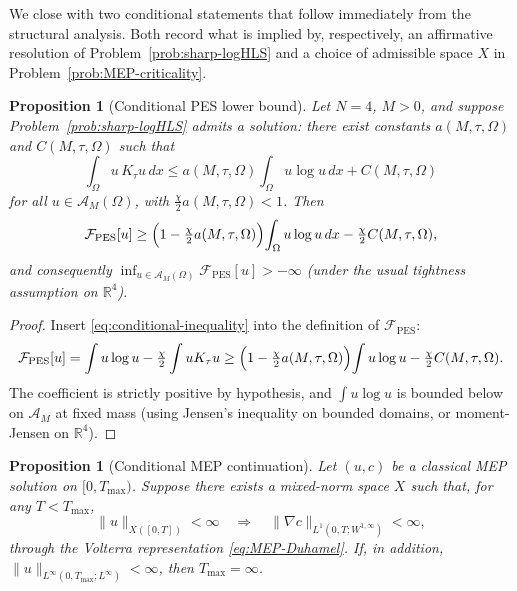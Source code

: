 \documentclass[11pt,reqno]{amsart}
\newtheorem{proposition}[theorem]{Proposition}
\theoremstyle{definition}
\theoremstyle{remark}
\newcommand{\R}{\mathbb{R}}
\newcommand{\Free}{\mathcal{F}}
\newcommand{\Adm}{\mathcal{A}}
\begin{document}
We close with two conditional statements that follow immediately from the structural analysis. Both record what is implied by, respectively, an affirmative resolution of Problem~\ref{prob:sharp-logHLS} and a choice of admissible space $X$ in Problem~\ref{prob:MEP-criticality}.

\begin{proposition}[Conditional PES lower bound]\label{prop:conditional-PES}
Let $N=4$, $M>0$, and suppose Problem~\ref{prob:sharp-logHLS} admits a solution: there exist constants $a(M,\tau,\Omega)$ and $C(M,\tau,\Omega)$ such that
\begin{equation}\label{eq:conditional-inequality}
        \int_\Omega u\,K_\tau u\,dx\le a(M,\tau,\Omega)\int_\Omega u\log u\,dx+C(M,\tau,\Omega)
\end{equation}
for all $u\in\Adm_M(\Omega)$, with $\tfrac{\chi}{2}a(M,\tau,\Omega)<1$. Then
\begin{equation}\label{eq:conditional-bound}
        \Free_{\mathrm{PES}}[u]\ge\Bigl(1-\tfrac{\chi}{2}a(M,\tau,\Omega)\Bigr)\!\int_\Omega u\log u\,dx-\tfrac{\chi}{2}C(M,\tau,\Omega),
\end{equation}
and consequently $\inf_{u\in\Adm_M(\Omega)}\Free_{\mathrm{PES}}[u]>-\infty$ (under the usual tightness assumption on $\R^{4}$).
\end{proposition}

\begin{proof}
Insert \eqref{eq:conditional-inequality} into the definition of $\Free_{\mathrm{PES}}$:
\[
        \Free_{\mathrm{PES}}[u]
        =\int u\log u-\tfrac{\chi}{2}\int u K_\tau u
        \ge\Bigl(1-\tfrac{\chi}{2}a(M,\tau,\Omega)\Bigr)\!\int u\log u-\tfrac{\chi}{2}C(M,\tau,\Omega).
\]
The coefficient is strictly positive by hypothesis, and $\int u\log u$ is bounded below on $\Adm_M$ at fixed mass (using Jensen's inequality on bounded domains, or moment-Jensen on $\R^{4}$).
\end{proof}

\begin{proposition}[Conditional MEP continuation]\label{prop:conditional-MEP}
Let $(u,c)$ be a classical MEP solution on $[0,T_{\max})$. Suppose there exists a mixed-norm space $X$ such that, for any $T<T_{\max}$,
\begin{equation}\label{eq:conditional-MEP-control}
        \|u\|_{X([0,T])}<\infty\quad\Longrightarrow\quad\|\nabla c\|_{L^{1}(0,T;W^{1,\infty})}<\infty,
\end{equation}
through the Volterra representation \eqref{eq:MEP-Duhamel}. If, in addition, $\|u\|_{L^{\infty}(0,T_{\max};L^{\infty})}<\infty$, then $T_{\max}=\infty$.
\end{proposition}
\end{document}
